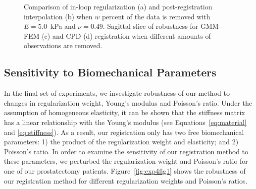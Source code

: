 \documentclass[journal]{IEEEtran}
\begin{document}
\begin{figure}
    \caption{Comparison of in-loop regularization (a) and post-registration interpolation (b) when $w$ percent of the data is removed with $E=5.0$~kPa and $\nu=0.49$. Sagittal slice of robustness for GMM-FEM (c) and CPD (d) registration when different amounts of observations are removed. \label{fig:exp3fig1}}
\end{figure}
\subsection{Sensitivity to Biomechanical Parameters}\label{sec:exp3}
In the final set of experiments, we investigate robustness of our method to changes in regularization weight, Young's modulus and Poisson's ratio. Under the assumption of homogeneous elasticity, it can be shown that the stiffness matrix has a linear relationship with the Young's modulus (see Equations~\eqref{eq:material} and \eqref{eq:stiffness}). As a result, our registration only has two free biomechanical parameters: 1) the product of the regularization weight and elasticity; and 2) Poisson's ratio. In order to examine the sensitivity of our registration method to these parameters, we perturbed the regularization weight and Poisson's ratio for one of our prostatectomy patients. Figure~\ref{fig:exp4fig1} shows the robustness of our registration method for different regularization weights and Poisson's ratios.
\end{document}
